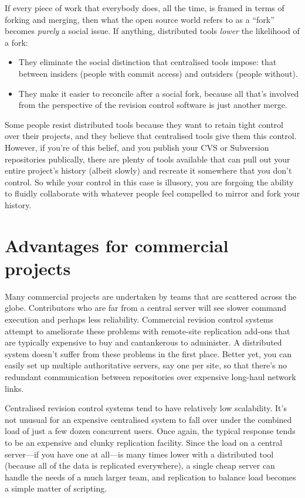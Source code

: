 If every piece of work that everybody does, all the time, is framed in
terms of forking and merging, then what the open source world refers
to as a ``fork'' becomes \emph{purely} a social issue.  If anything,
distributed tools \emph{lower} the likelihood of a fork:
\begin{itemize}
\item They eliminate the social distinction that centralised tools
  impose: that between insiders (people with commit access) and
  outsiders (people without).
\item They make it easier to reconcile after a social fork, because
  all that's involved from the perspective of the revision control
  software is just another merge.
\end{itemize}

Some people resist distributed tools because they want to retain tight
control over their projects, and they believe that centralised tools
give them this control.  However, if you're of this belief, and you
publish your CVS or Subversion repositories publically, there are
plenty of tools available that can pull out your entire project's
history (albeit slowly) and recreate it somewhere that you don't
control.  So while your control in this case is illusory, you are
forgoing the ability to fluidly collaborate with whatever people feel
compelled to mirror and fork your history.

\section{Advantages for commercial projects}

Many commercial projects are undertaken by teams that are scattered
across the globe.  Contributors who are far from a central server will
see slower command execution and perhaps less reliability.  Commercial
revision control systems attempt to ameliorate these problems with
remote-site replication add-ons that are typically expensive to buy
and cantankerous to administer.  A distributed system doesn't suffer
from these problems in the first place.  Better yet, you can easily
set up multiple authoritative servers, say one per site, so that
there's no redundant communication between repositories over expensive
long-haul network links.

Centralised revision control systems tend to have relatively low
scalability.  It's not unusual for an expensive centralised system to
fall over under the combined load of just a few dozen concurrent
users.  Once again, the typical response tends to be an expensive and
clunky replication facility.  Since the load on a central server---if
you have one at all---is many times lower with a distributed
tool (because all of the data is replicated everywhere), a single
cheap server can handle the needs of a much larger team, and
replication to balance load becomes a simple matter of scripting.

